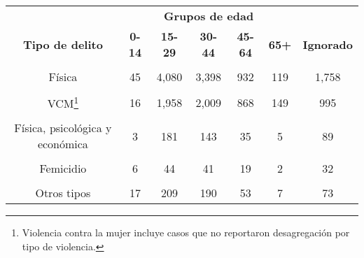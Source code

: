 \begin{tabular}[t]{ccccccc}
\toprule
\multicolumn{1}{c}{\textbf{ }} & \multicolumn{5}{c}{\textbf{Grupos de edad}} & \multicolumn{1}{c}{\textbf{ }} \\
\cmidrule(l{3pt}r{3pt}){2-6}
\textbf{Tipo de delito} & \textbf{0-14} & \textbf{15-29} & \textbf{30-44} & \textbf{45-64} & \textbf{65+} & \textbf{Ignorado}\\
\midrule
\cellcolor[HTML]{A8A4FB}{Psicológica} & \cellcolor[HTML]{A8A4FB}{58} & \cellcolor[HTML]{A8A4FB}{5,765} & \cellcolor[HTML]{A8A4FB}{5,921} & \cellcolor[HTML]{A8A4FB}{2,193} & \cellcolor[HTML]{A8A4FB}{348} & \cellcolor[HTML]{A8A4FB}{3,162}\\
Física & 45 & 4,080 & 3,398 & 932 & 119 & 1,758\\
\cellcolor[HTML]{A8A4FB}{Física y psicológica} & \cellcolor[HTML]{A8A4FB}{35} & \cellcolor[HTML]{A8A4FB}{3,841} & \cellcolor[HTML]{A8A4FB}{3,011} & \cellcolor[HTML]{A8A4FB}{829} & \cellcolor[HTML]{A8A4FB}{90} & \cellcolor[HTML]{A8A4FB}{1,772}\\
VCM\footnote{Violencia contra la mujer incluye casos que no reportaron desagregación por tipo de violencia.} & 16 & 1,958 & 2,009 & 868 & 149 & 995\\
\cellcolor[HTML]{A8A4FB}{Psicológica y económica} & \cellcolor[HTML]{A8A4FB}{0} & \cellcolor[HTML]{A8A4FB}{183} & \cellcolor[HTML]{A8A4FB}{221} & \cellcolor[HTML]{A8A4FB}{89} & \cellcolor[HTML]{A8A4FB}{23} & \cellcolor[HTML]{A8A4FB}{89}\\
Física, psicológica y económica & 3 & 181 & 143 & 35 & 5 & 89\\
\cellcolor[HTML]{A8A4FB}{VCM y económica} & \cellcolor[HTML]{A8A4FB}{0} & \cellcolor[HTML]{A8A4FB}{96} & \cellcolor[HTML]{A8A4FB}{124} & \cellcolor[HTML]{A8A4FB}{50} & \cellcolor[HTML]{A8A4FB}{6} & \cellcolor[HTML]{A8A4FB}{58}\\
Femicidio & 6 & 44 & 41 & 19 & 2 & 32\\
\cellcolor[HTML]{A8A4FB}{Física y económica} & \cellcolor[HTML]{A8A4FB}{1} & \cellcolor[HTML]{A8A4FB}{46} & \cellcolor[HTML]{A8A4FB}{42} & \cellcolor[HTML]{A8A4FB}{10} & \cellcolor[HTML]{A8A4FB}{0} & \cellcolor[HTML]{A8A4FB}{21}\\
Otros tipos & 17 & 209 & 190 & 53 & 7 & 73\\
\bottomrule
\end{tabular}
